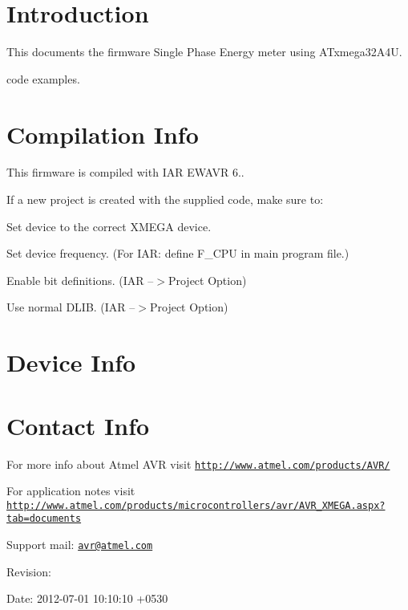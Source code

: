 \hypertarget{index_intro}{}\section{Introduction}\label{index_intro}
This documents the firmware Single Phase Energy meter using A\-Txmega32\-A4\-U.\par
 \par


code examples.\par
\hypertarget{index_compinfo}{}\section{Compilation Info}\label{index_compinfo}
This firmware is compiled with I\-A\-R E\-W\-A\-V\-R 6..

If a new project is created with the supplied code, make sure to\-:
\begin{DoxyItemize}
\item Set device to the correct X\-M\-E\-G\-A device.
\item Set device frequency. (For I\-A\-R\-: define F\-\_\-\-C\-P\-U in main program file.)
\item Enable bit definitions. (I\-A\-R --$>$Project Option)
\item Use normal D\-L\-I\-B. (I\-A\-R --$>$Project Option)
\end{DoxyItemize}\hypertarget{index_deviceinfo}{}\section{Device Info}\label{index_deviceinfo}
\hypertarget{index_contactinfo}{}\section{Contact Info}\label{index_contactinfo}
For more info about Atmel A\-V\-R visit \href{http://www.atmel.com/products/AVR/}{\tt http\-://www.\-atmel.\-com/products/\-A\-V\-R/} \par
 For application notes visit \href{http://www.atmel.com/products/microcontrollers/avr/AVR_XMEGA.aspx?tab=documents}{\tt http\-://www.\-atmel.\-com/products/microcontrollers/avr/\-A\-V\-R\-\_\-\-X\-M\-E\-G\-A.\-aspx?tab=documents} \par
 Support mail\-: \href{mailto:avr@atmel.com}{\tt avr@atmel.\-com} \par


\begin{DoxyParagraph}{Revision\-:}

\end{DoxyParagraph}
\begin{DoxyParagraph}{Date\-:}
2012-\/07-\/01 10\-:10\-:10 +0530 
\end{DoxyParagraph}


